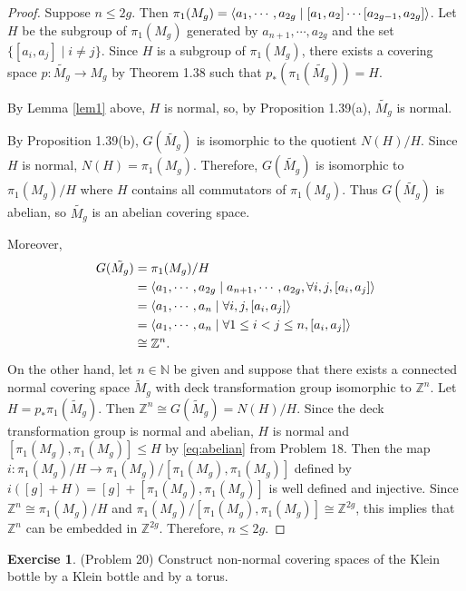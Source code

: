 \documentclass[12pt, psamsfonts]{amsart}
\theoremstyle{definition}
\newtheorem*{exer}{Exercise}
\theoremstyle{remark}
\numberwithin{equation}{section}
\begin{document}
\begin{proof}
  Suppose $n \leq 2g$.
  Then $\pi_1(M_g) = \ev{a_1, \cdots, a_{2g} \mid [a_1, a_2] \cdots [a_{2g - 1}, a_{2g}]}$.
  Let $H$ be the subgroup of $\pi_1(M_g)$ generated by $a_{n + 1}, \cdots, a_{2g}$ and the set $\{ [a_i, a_j] \mid i \ne j \}$.
  Since $H$ is a subgroup of $\pi_1(M_g)$, there exists a covering space $p: \tilde{M_g} \rightarrow M_g$ by Theorem 1.38 such that $p_*(\pi_1(\tilde{M_g})) = H$.

  By Lemma \ref{lem1} above, $H$ is normal, so, by Proposition 1.39(a), $\tilde{M_g}$ is normal.

  By Proposition 1.39(b), $G(\tilde{M_g})$ is isomorphic to the quotient $N(H) / H$.
  Since $H$ is normal, $N(H) = \pi_1(M_g)$.
  Therefore, $G(\tilde{M_g})$ is isomorphic to $\pi_1(M_g) / H$ where $H$ contains all commutators of $\pi_1(M_g)$.
  Thus $G(\tilde{M_g})$ is abelian, so $\tilde{M_g}$ is an abelian covering space.

  Moreover,
  \begin{align*}
    G(\tilde{M_g})
      &= \pi_1(M_g) / H \\
      &= \ev{a_1, \cdots, a_{2g} \mid a_{n + 1}, \cdots, a_{2g}, \forall i, j, [a_i, a_j]} \\
      &= \ev{a_{1}, \cdots, a_{n} \mid \forall i, j, [a_i, a_j]} \\
      &= \ev{a_{1}, \cdots, a_{n} \mid \forall 1 \leq i < j \leq n, [a_i, a_j]} \\
      &\cong \mathbb{Z}^n.
  \end{align*}
  On the other hand, let $n \in \mathbb{N}$ be given and suppose that there exists a connected normal covering space $\tilde{M}_g$ with deck transformation group isomorphic to $\mathbb{Z}^n$.
  Let $H = p_*\pi_1(\tilde{M}_g)$.
  Then $\mathbb{Z}^n \cong G(\tilde{M}_g) = N(H) / H$.
  Since the deck transformation group is normal and abelian, $H$ is normal and $[\pi_1(M_g), \pi_1(M_g)] \leq H$ by \eqref{eq:abelian} from Problem 18.  
  Then the map $i: \pi_1(M_g) / H \rightarrow \pi_1(M_g)/[\pi_1(M_g), \pi_1(M_g)]$ defined by $i([g] + H) = [g] + [\pi_1(M_g), \pi_1(M_g)]$ is well defined and injective.
  Since $\mathbb{Z}^n \cong \pi_1(M_g) / H$ and $\pi_1(M_g) / [\pi_1(M_g), \pi_1(M_g)] \cong \mathbb{Z}^{2g}$, this implies that $\mathbb{Z}^n$ can be embedded in $\mathbb{Z}^{2g}$.
  Therefore, $n \leq 2g$.
\end{proof}

\begin{exer}{(Problem 20)}
  Construct non-normal covering spaces of the Klein bottle by a Klein bottle and by a torus.
\end{exer}
\end{document}
